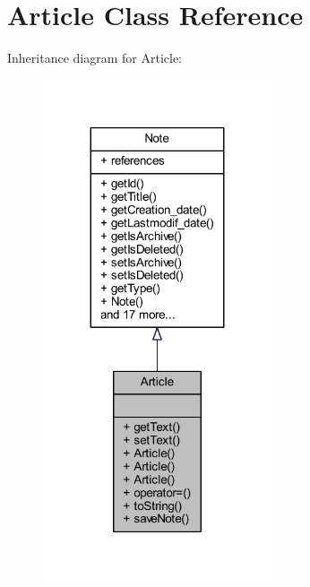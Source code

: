 \hypertarget{class_article}{}\section{Article Class Reference}
\label{class_article}


Inheritance diagram for Article\+:\nopagebreak
\begin{figure}[H]
\begin{center}
\leavevmode
\includegraphics[width=191pt]{class_article__inherit__graph}
\end{center}
\end{figure}


